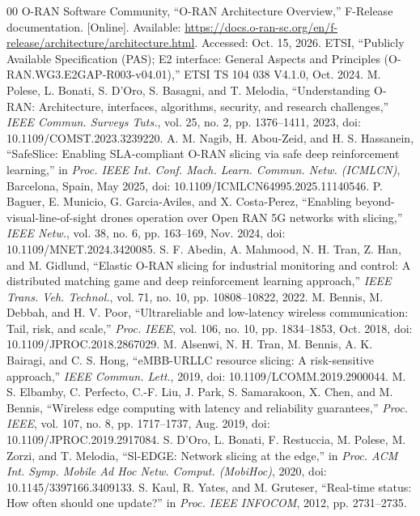 \documentclass[conference]{IEEEtran}
\begin{document}
\begin{thebibliography}{00}
 O-RAN Software Community, ``O-RAN Architecture Overview,'' F-Release documentation. [Online]. Available: \url{https://docs.o-ran-sc.org/en/f-release/architecture/architecture.html}. Accessed: Oct. 15, 2026.
 ETSI, ``Publicly Available Specification (PAS); E2 interface: General Aspects and Principles (O-RAN.WG3.E2GAP-R003-v04.01),'' ETSI TS 104 038 V4.1.0, Oct. 2024.
 M. Polese, L. Bonati, S. D'Oro, S. Basagni, and T. Melodia, ``Understanding O-RAN: Architecture, interfaces, algorithms, security, and research challenges,'' \emph{IEEE Commun. Surveys Tuts.}, vol. 25, no. 2, pp. 1376--1411, 2023, doi: 10.1109/COMST.2023.3239220.
 A. M. Nagib, H. Abou-Zeid, and H. S. Hassanein, ``SafeSlice: Enabling SLA-compliant O-RAN slicing via safe deep reinforcement learning,'' in \emph{Proc. IEEE Int. Conf. Mach. Learn. Commun. Netw. (ICMLCN)}, Barcelona, Spain, May 2025, doi: 10.1109/ICMLCN64995.2025.11140546.
 P. Baguer, E. Municio, G. Garcia-Aviles, and X. Costa-Perez, ``Enabling beyond-visual-line-of-sight drones operation over Open RAN 5G networks with slicing,'' \emph{IEEE Netw.}, vol. 38, no. 6, pp. 163--169, Nov. 2024, doi: 10.1109/MNET.2024.3420085.
 S. F. Abedin, A. Mahmood, N. H. Tran, Z. Han, and M. Gidlund, ``Elastic O-RAN slicing for industrial monitoring and control: A distributed matching game and deep reinforcement learning approach,'' \emph{IEEE Trans. Veh. Technol.}, vol. 71, no. 10, pp. 10808--10822, 2022.
 M. Bennis, M. Debbah, and H. V. Poor, ``Ultrareliable and low-latency wireless communication: Tail, risk, and scale,'' \emph{Proc. IEEE}, vol. 106, no. 10, pp. 1834--1853, Oct. 2018, doi: 10.1109/JPROC.2018.2867029.
 M. Alsenwi, N. H. Tran, M. Bennis, A. K. Bairagi, and C. S. Hong, ``eMBB-URLLC resource slicing: A risk-sensitive approach,'' \emph{IEEE Commun. Lett.}, 2019, doi: 10.1109/LCOMM.2019.2900044.
 M. S. Elbamby, C. Perfecto, C.-F. Liu, J. Park, S. Samarakoon, X. Chen, and M. Bennis, ``Wireless edge computing with latency and reliability guarantees,'' \emph{Proc. IEEE}, vol. 107, no. 8, pp. 1717--1737, Aug. 2019, doi: 10.1109/JPROC.2019.2917084.
 S. D'Oro, L. Bonati, F. Restuccia, M. Polese, M. Zorzi, and T. Melodia, ``Sl-EDGE: Network slicing at the edge,'' in \emph{Proc. ACM Int. Symp. Mobile Ad Hoc Netw. Comput. (MobiHoc)}, 2020, doi: 10.1145/3397166.3409133.
 S. Kaul, R. Yates, and M. Gruteser, ``Real-time status: How often should one update?'' in \emph{Proc. IEEE INFOCOM}, 2012, pp. 2731--2735.

\end{thebibliography}
\end{document}
